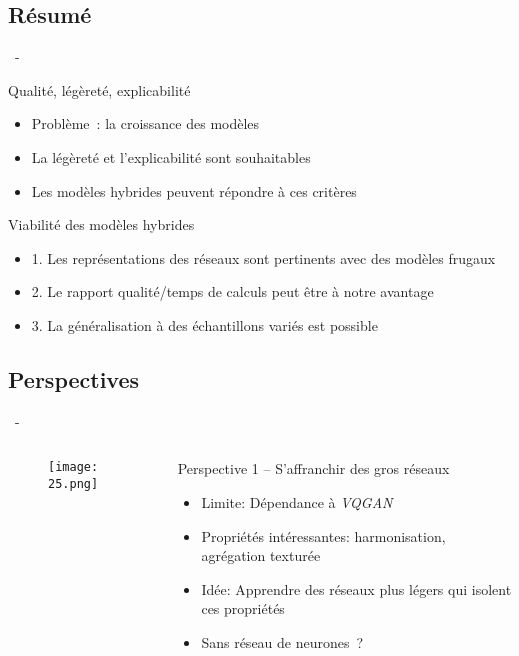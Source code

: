 \documentclass[aspectratio=169, 22pt]{beamer}
\begin{document}
\subsection{Résumé}
\begin{frame}{\secname~- \subsecname}
  \begin{customblock}{Qualité, légèreté, explicabilité}
    \begin{itemize}
    \item Problème : la croissance des modèles 
    \item La légèreté et l'explicabilité sont souhaitables
    \item Les modèles hybrides peuvent répondre à ces critères
    \end{itemize}
  \end{customblock}

  \pause
  \begin{exampleblock}{Viabilité des modèles hybrides}
    \begin{itemize}  
    \item 1. Les représentations des réseaux sont pertinents avec des modèles frugaux
    \item 2. Le rapport qualité/temps de calculs peut être à notre avantage
    \item 3. La généralisation à des échantillons variés est possible
    \end{itemize}
  \end{exampleblock}
\end{frame}

\subsection{Perspectives}
\begin{frame}{\secname~- \subsecname}
  \begin{columns}
    \begin{column}{0.3\linewidth}
      \begin{figure}
        \centering
        \texttt{[image: 25.png]}
      \end{figure}
    \end{column}
    \begin{column}{0.7\linewidth}
      \begin{block}{Perspective 1 – S'affranchir des gros réseaux}
        \begin{itemize}
        \item \alert{Limite}: Dépendance à \emph{VQGAN}
        \item Propriétés intéressantes: harmonisation, agrégation texturée

        \item \alert{Idée}: Apprendre des réseaux plus légers qui isolent ces propriétés
        \item Sans réseau de neurones ?
        \end{itemize}

      \end{block}
    \end{column}
  \end{columns}
\end{frame}
\end{document}
